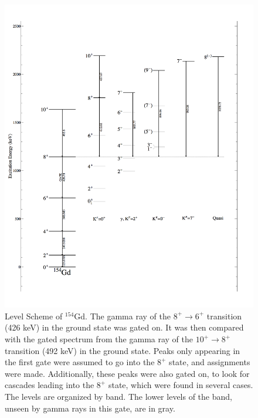 \begin{figure}[!]
    \centering
    \includegraphics[scale=0.25]{154GdTablesAndFigs/154Gd_8to6.png}
    \caption{Level Scheme of $^{154}$Gd. The gamma ray of the $8^+\rightarrow6^+$ transition (426 keV) in the ground state was gated on. It was then compared with the gated spectrum from the gamma ray of the $10^+\rightarrow8^+$ transition (492 keV) in the ground state. Peaks only appearing in the first gate were assumed to go into the $8^+$ state, and assignments were made. Additionally, these peaks were also gated on, to look for cascades leading into the $8^+$ state, which were found in several cases. The levels are organized by band. The lower levels of the band, unseen by gamma rays in this gate, are in gray.}
    \label{fig:154_8to6}
\end{figure}